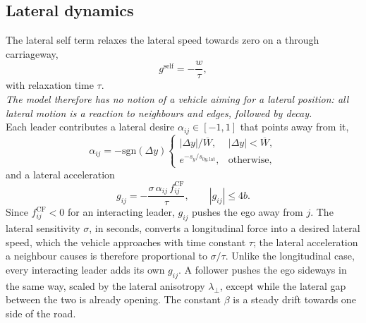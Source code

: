 \documentclass[11pt]{article}
\begin{document}
\subsection{Lateral dynamics}
The lateral self term relaxes the lateral speed towards zero on a through
carriageway,
\begin{equation}
g^{\mathrm{self}}=-\frac{w}{\tau},
\label{eq:gself}
\end{equation}
with relaxation time $\tau$. \\
\textit{The model therefore has no notion of a vehicle
aiming for a lateral position: all lateral motion is a reaction to neighbours
and edges, followed by decay.}\\
 Each leader contributes a lateral desire
$\alpha_{ij}\in[-1,1]$ that points away from it,
\begin{equation}
\alpha_{ij}=-\mathrm{sgn}(\Delta y)\begin{cases}
|\Delta y|/\overline W, & |\Delta y|<\overline W,\\[3pt]
e^{-s_y/s_{0y,\mathrm{lat}}}, & \text{otherwise,}\end{cases}
\end{equation}
and a lateral acceleration
\begin{equation}
g_{ij}=-\frac{\sigma\,\alpha_{ij}\,f^{\mathrm{CF}}_{ij}}{\tau},\qquad |g_{ij}|\le4b.
\label{eq:gint}
\end{equation}
Since $f^{\mathrm{CF}}_{ij}<0$ for an interacting leader, $g_{ij}$ pushes the
ego away from $j$. The lateral sensitivity $\sigma$, in seconds, converts a
longitudinal force into a desired lateral speed, which the vehicle approaches
with time constant $\tau$; the lateral acceleration a neighbour causes is
therefore proportional to $\sigma/\tau$. Unlike the longitudinal case, every
interacting leader adds its own $g_{ij}$. A follower pushes the ego sideways in
the same way, scaled by the lateral anisotropy $\lambda_\perp$, except while the
lateral gap between the two is already opening. The constant $\beta$ is a
steady drift towards one side of the road.
\end{document}
